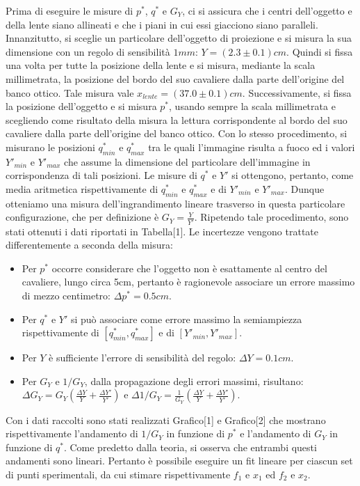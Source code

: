 \documentclass{article}
\begin{document}
	Prima di eseguire le misure di $p^*$, $q^*$ e $G_Y$, ci si assicura che i centri dell'oggetto e della lente siano allineati e che i piani in cui essi giacciono siano paralleli. Innanzitutto, si sceglie un particolare dell'oggetto di proiezione e si misura la sua dimensione con un regolo di sensibilità $1mm$: $Y=(2.3\pm0.1)cm$. Quindi si fissa una volta per tutte la posizione della lente e si misura, mediante la scala millimetrata, la posizione del bordo del suo cavaliere dalla parte dell'origine del banco ottico. Tale misura vale $x_{lente}=(37.0\pm0.1)cm$. Successivamente, si fissa la posizione dell'oggetto e si misura $p^*$, usando sempre la scala millimetrata e scegliendo come risultato della misura la lettura corrispondente al bordo del suo cavaliere dalla parte dell'origine del banco ottico. Con lo stesso procedimento, si misurano le posizioni $q^*_{min}$ e $q^*_{max}$ tra le quali l'immagine risulta a fuoco ed i valori $Y'_{min}$ e $Y'_{max}$ che assume la dimensione del particolare dell'immagine in corrispondenza di tali posizioni. 
	Le misure di $q^*$ e $Y'$ si ottengono, pertanto, come media aritmetica rispettivamente di $q^*_{min}$ e $q^*_{max}$ e di $Y'_{min}$ e $Y'_{max}$. Dunque otteniamo una misura dell'ingrandimento lineare trasverso in questa particolare configurazione, che per definizione è $G_Y = \frac{Y}{Y'}$. Ripetendo tale procedimento, sono stati ottenuti i dati riportati in Tabella[1]. Le incertezze vengono trattate differentemente a seconda della misura:
	\begin{itemize}
		\item Per $p^*$ occorre considerare che l'oggetto non è esattamente al centro del cavaliere, lungo circa 5cm, pertanto è ragionevole associare un errore massimo di mezzo centimetro: $\Delta p^* = 0.5 cm$.
		\item Per $q^*$ e $Y'$ si può associare come errore massimo la semiampiezza rispettivamente di $[q^*_{min},q^*_{max}]$ e di $[Y'_{min},Y'_{max}]$.
		\item Per $Y$ è sufficiente l'errore di sensibilità del regolo: $\Delta Y = 0.1 cm$.
		\item Per $G_Y$ e $1/G_Y$, dalla propagazione degli errori massimi, risultano: $\Delta G_Y = G_Y (\frac{\Delta Y}{Y}+\frac{\Delta Y'}{Y'})$ e
		$\Delta 1/G_Y = \frac{1}{G_Y} (\frac{\Delta Y}{Y}+\frac{\Delta Y'}{Y'})$.
	\end{itemize}
	Con i dati raccolti sono stati realizzati Grafico[1] e Grafico[2] che mostrano rispettivamente l'andamento di $1/G_Y$ in funzione di $p^*$ e l'andamento di $G_Y$ in funzione di $q^*$. Come predetto dalla teoria, si osserva che entrambi questi andamenti sono lineari. Pertanto è possibile eseguire un fit lineare per ciascun set di punti sperimentali, da cui stimare rispettivamente $f_1$ e $x_1$ ed $f_2$ e $x_2$.
	
\end{document}
